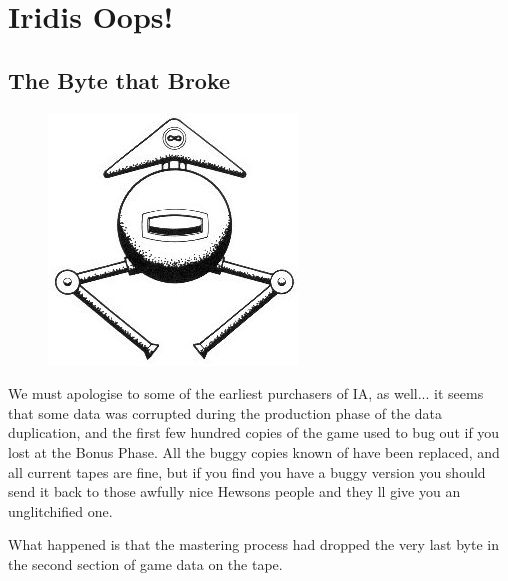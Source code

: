 \chapter{Iridis Oops!} 
\label{sec:bugs}
\lstset{style=6502Style}

\section{The Byte that Broke}
\begin{definition}
\setlength{\intextsep}{0pt}%
\setlength{\columnsep}{3pt}%
\begin{figure}
\includegraphics[width=\linewidth]{src/callout/ia.jpg} 
\end{figure}
\small
We must apologise to some of the earliest purchasers of IA, as well... it
seems that some data was corrupted during the production phase of the
data duplication, and the first few hundred copies of the game used to bug
out if you lost at the Bonus Phase. All the buggy copies known of have
been replaced, and all current tapes are fine, but if you find you have a
buggy version you should send it back to those awfully nice Hewsons
people and they ll give you an unglitchified one.
\end{definition}

What happened is that the mastering process had dropped the very last byte in the second
section of game data on the tape.

